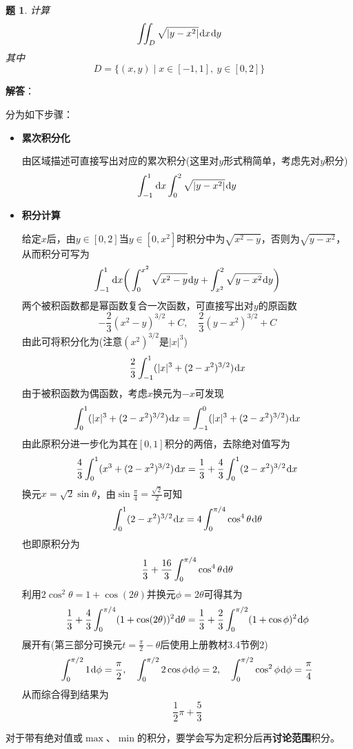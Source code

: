 \documentclass[a4paper,UTF8,fontset=windows,AutoFakeBold]{ctexart}
\newcommand*{\dr}{\hspace{0.07em}\mathrm{d}}
\newcommand*{\note}{\noindent *}
\theoremstyle{ex}
\newtheorem{exercise}{题}
\newcommand{\sol}[1]{{\vspace{5pt}\kaishu\noindent\textbf{解答}：\vspace{-3pt}
\begin{compactitem}
    \item[] #1
\end{compactitem}
}}
\begin{document}
\begin{framed}
\begin{exercise}
    计算
    $$\iint_D\sqrt{|y-x^2|}\dr x\dr y$$
    其中
    $$D=\{(x,y)\mid x\in[-1,1],\ y\in[0,2]\}$$
\end{exercise}
\sol{
    分为如下步骤：
    \begin{itemize}
        \item \textbf{累次积分化}
        
        由区域描述可直接写出对应的累次积分(这里对$y$形式稍简单，考虑先对$y$积分)
        $$\int_{-1}^1\dr x\int_0^2\sqrt{|y-x^2|}\dr y$$

        \item \textbf{积分计算}
        
        给定$x$后，由$y\in[0,2]$当$y\in[0,x^2]$时积分中为$\sqrt{x^2-y}$，否则为$\sqrt{y-x^2}$，从而积分可写为
        $$\int_{-1}^1\dr x\bigg(\int_0^{x^2}\sqrt{x^2-y}\dr y+\int_{x^2}^2\sqrt{y-x^2}\dr y\bigg)$$
        两个被积函数都是幂函数复合一次函数，可直接写出对$y$的原函数
        $$-\frac{2}{3}(x^2-y)^{3/2}+C,\quad\frac{2}{3}(y-x^2)^{3/2}+C$$
        由此可将积分化为(注意$(x^2)^{3/2}$是$|x|^3$)
        $$\frac{2}{3}\int_{-1}^1(|x|^3+(2-x^2)^{3/2})\dr x$$
        由于被积函数为偶函数，考虑$x$换元为$-x$可发现
        $$\int_0^1(|x|^3+(2-x^2)^{3/2})\dr x=\int_{-1}^0(|x|^3+(2-x^2)^{3/2})\dr x$$
        由此原积分进一步化为其在$[0,1]$积分的两倍，去除绝对值写为
        $$\frac{4}{3}\int_0^1(x^3+(2-x^2)^{3/2})\dr x=\frac{1}{3}+\frac{4}{3}\int_0^1(2-x^2)^{3/2}\dr x$$
        换元$x=\sqrt{2}\sin\theta$，由$\sin\frac{\pi}{4}=\frac{\sqrt2}{2}$可知
        $$\int_0^1(2-x^2)^{3/2}\dr x=4\int_0^{\pi/4}\cos^4\theta\dr\theta$$
        也即原积分为
        $$\frac{1}{3}+\frac{16}{3}\int_0^{\pi/4}\cos^4\theta\dr\theta$$
        利用$2\cos^2\theta=1+\cos(2\theta)$并换元$\phi=2\theta$可得其为
        $$\frac{1}{3}+\frac{4}{3}\int_0^{\pi/4}(1+\cos(2\theta))^2\dr\theta=\frac{1}{3}+\frac{2}{3}\int_0^{\pi/2}(1+\cos\phi)^2\dr\phi$$
        展开有(第三部分可换元$t=\frac{\pi}{2}-\theta$后使用上册教材3.4节例2)
        $$\int_0^{\pi/2}1\dr\phi=\frac{\pi}{2},\quad\int_0^{\pi/2}2\cos\phi\dr\phi=2,\quad\int_0^{\pi/2}\cos^2\phi\dr\phi=\frac{\pi}{4}$$
        从而综合得到结果为
        $$\frac{1}{2}\pi+\frac{5}{3}$$
    \end{itemize}
}
\end{framed}

\note 对于带有绝对值或$\max$、$\min$的积分，要学会写为定积分后再\textbf{讨论范围}积分。
\end{document}

